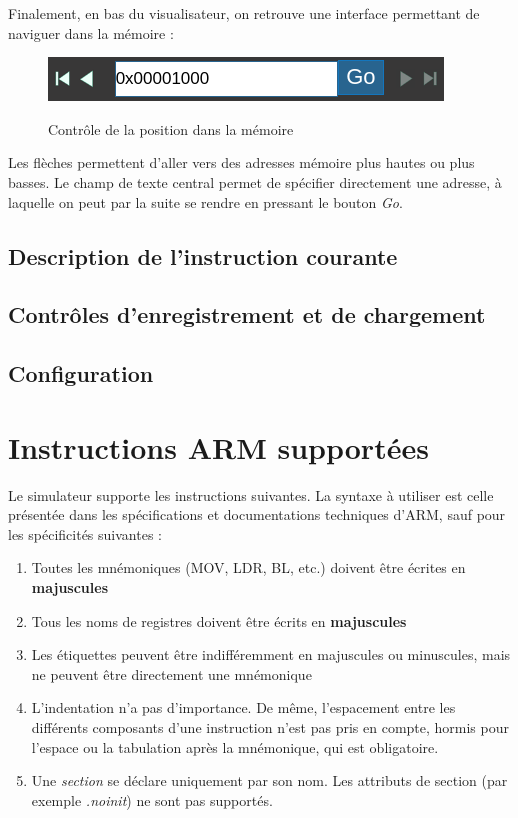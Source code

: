\documentclass{tufte-handout}
\begin{document}
Finalement, en bas du visualisateur, on retrouve une interface permettant de naviguer dans la mémoire :
\begin{figure}[h!]
\raggedleft
\includegraphics[width=0.6\linewidth]{pics/memoire_goto.png}
\label{f:memoiregoto}
\caption{Contrôle de la position dans la mémoire}
\end{figure}

 Les flèches permettent d'aller vers des adresses mémoire plus hautes ou plus basses. Le champ de texte central permet de spécifier directement une adresse, à laquelle on peut par la suite se rendre en pressant le bouton \textit{Go}.


\subsection{Description de l'instruction courante}

\subsection{Contrôles d'enregistrement et de chargement}

\subsection{Configuration}

\section{Instructions ARM supportées}

Le simulateur supporte les instructions suivantes. La syntaxe à utiliser est celle présentée dans les spécifications et documentations techniques d'ARM, sauf pour les spécificités suivantes :
\begin{enumerate}
	\item Toutes les mnémoniques (MOV, LDR, BL, etc.) doivent être écrites en \textbf{majuscules}
	\item Tous les noms de registres doivent être écrits en \textbf{majuscules}
	\item Les étiquettes peuvent être indifféremment en majuscules ou minuscules, mais ne peuvent être directement une mnémonique
	\item L'indentation n'a pas d'importance. De même, l'espacement entre les différents composants d'une instruction n'est pas pris en compte, hormis pour l'espace ou la tabulation après la mnémonique, qui est obligatoire.
	\item Une \emph{section} se déclare uniquement par son nom. Les attributs de section (par exemple \textit{.noinit}) ne sont pas supportés.

\end{enumerate}
\end{document}
